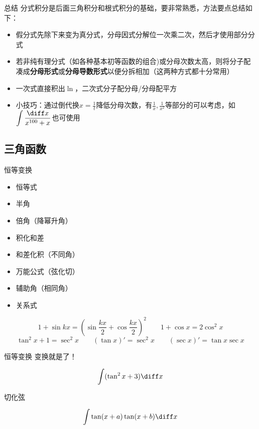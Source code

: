 \documentclass{myslide}
\begin{document}
\begin{frame}{总结}
分式积分是后面三角积分和根式积分的基础，要非常熟悉，方法要点总结如下：
\begin{itemize}
	\item 假分式先除下来变为真分式，分母因式分解位一次乘二次，然后才使用部分分式
	\item 若非纯有理分式（如各种基本初等函数的组合)或分母次数太高，则将分子配凑成\textbf{分母形式}或\textbf{分母导数形式}以便分拆相加（这两种方式都十分常用）
	\item 一次式直接积出$\ln$，二次式分子配分母/分母配平方
	\item 小技巧：通过倒代换$\displaystyle x=\frac{1}{t}$降低分母次数，有$\displaystyle\frac{1}{x},\frac{1}{x^2}$等部分的可以考虑，如$\displaystyle\int\frac{\diff x}{x^{100}+x}$也可使用
\end{itemize}
\end{frame}

\subsection{三角函数}
\begin{frame}
\subsectionpage
\end{frame}

\begin{frame}{恒等变换}
\begin{itemize}
	\item 恒等式
	\item 半角
	\item 倍角（降幂升角）
	\item 积化和差
	\item 和差化积（不同角）
	\item 万能公式（弦化切）
	\item 辅助角（相同角）
	\item 关系式
\end{itemize}
\[1+\sin kx=\left(\sin\frac{kx}{2}+\cos\frac{kx}{2}\right)^2\qquad1+\cos x=2\cos^2 x\]
\[\tan^2 x+1=\sec^2 x\qquad(\tan x)'=\sec^2 x\qquad(\sec x)'=\tan x\sec x\]
\end{frame}

\begin{frame}{恒等变换}
变换就是了！
\begin{exercise}[\textsection 6.1/1(9)]
\[\int(\tan^2 x+3)\diff x\]
\end{exercise}
切化弦
\begin{example}
\[\int \tan(x+a)\tan(x+b)\diff x\]
\end{example}
\end{frame}
\end{document}

